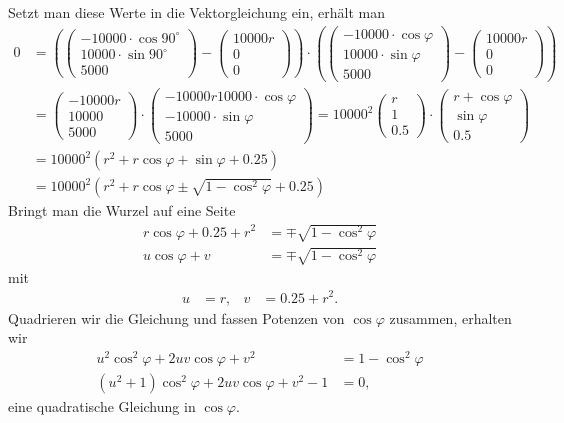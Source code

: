 \begin{loesung}
\begin{teilaufgaben}
Setzt man diese Werte in die Vektorgleichung ein, erhält man
\begin{align*}
0
&=
\left(
\begin{pmatrix}
-10000\cdot\cos 90^\circ\\
 10000\cdot\sin 90^\circ\\
5000
\end{pmatrix}
-\begin{pmatrix}10000r\\0\\0\end{pmatrix}
\right)
\cdot
\left(
\begin{pmatrix}
-10000\cdot\cos\varphi\\
 10000\cdot\sin\varphi\\
5000
\end{pmatrix}
-\begin{pmatrix}10000r\\0\\0\end{pmatrix}
\right)
\\
&=
\begin{pmatrix}
-10000r\\
 10000\\
 5000
\end{pmatrix}
\cdot
\begin{pmatrix}
-10000r
 10000\cdot\cos\varphi\\
-10000\cdot\sin\varphi\\
  5000
\end{pmatrix}
=
10000^2
\begin{pmatrix}
r\\
1\\
0.5
\end{pmatrix}
\cdot
\begin{pmatrix}
r
+
\cos\varphi\\
\sin\varphi\\
0.5
\end{pmatrix}
\\
&=
10000^2 ( r^2 + r\cos\varphi+\sin\varphi +0.25)
\\
&=
10000^2 ( r^2 + r\cos\varphi\pm\sqrt{1-\cos^2\varphi}+0.25)
\end{align*}
Bringt man die Wurzel auf eine Seite
\begin{align*}
r\cos\varphi + 0.25+r^2&=\mp\sqrt{1-\cos^2\varphi}\\
u\cos\varphi + v&=\mp\sqrt{1-\cos^2\varphi}
\end{align*}
mit
\[
\begin{aligned}
u&=r,&
v&=0.25 + r^2.
\end{aligned}
\]
Quadrieren wir die Gleichung und fassen Potenzen von $\cos\varphi$
zusammen, erhalten wir
\begin{align*}
u^2\cos^2\varphi + 2uv\cos\varphi+v^2&=1-\cos^2\varphi
\\
(u^2+1)\cos^2\varphi +2uv\cos\varphi+v^2-1&=0,
\end{align*}
eine quadratische Gleichung in $\cos\varphi$.


\end{teilaufgaben}
\end{loesung}
